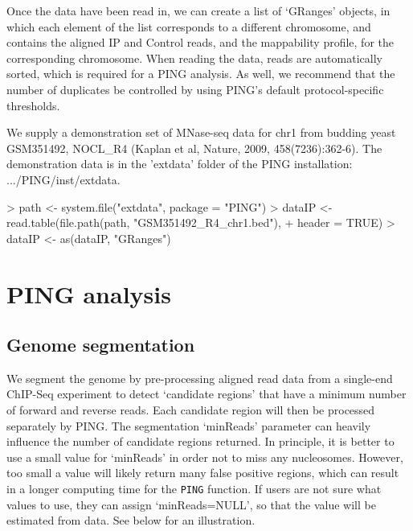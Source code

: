 \documentclass[11pt]{article}
\begin{document}
Once the data have been read in, we can create a list of `GRanges' objects, in which each element of the list corresponds to a different chromosome, and contains the aligned IP and Control reads, and the mappability profile, for the corresponding chromosome. When reading the data, reads are automatically sorted, which is required for a PING analysis. As well, we recommend that the number of duplicates be controlled by using PING's default protocol-specific thresholds.

We supply a demonstration set of MNase-seq data for chr1 from budding yeast GSM351492, NOCL\_R4 (Kaplan et al, Nature, 2009, 458(7236):362-6). The demonstration data is in the 'extdata' folder of the PING installation:  .../PING/inst/extdata.
\begin{Schunk}
\begin{Sinput}
> path <- system.file("extdata", package = "PING")
> dataIP <- read.table(file.path(path, "GSM351492_R4_chr1.bed"), 
+     header = TRUE)
> dataIP <- as(dataIP, "GRanges")
\end{Sinput}
\end{Schunk}



\section{PING analysis}

\subsection{Genome segmentation}
We segment the genome by pre-processing aligned read data from a single-end
ChIP-Seq experiment to detect `candidate regions' that have a minimum number of
forward and reverse reads. Each candidate region will then be processed
separately by PING. The segmentation `minReads' parameter can heavily influence
the number of candidate regions returned. In principle, it is better to use a
small value for `minReads' in order not to miss any nucleosomes. However, too
small a value will likely return many false positive regions, which can result
in a longer computing time for the \texttt{PING} function. 
If users are not sure what values to use, they can assign `minReads=NULL', so
that the value will be estimated from data. See below for an illustration.
\end{document}
